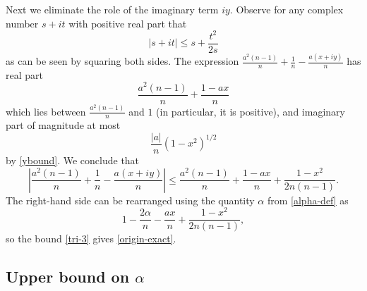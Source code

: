 \documentclass[12pt]{article}
\begin{document}
Next we eliminate the role of the imaginary term $iy$.
 Observe for any complex number $s+it$ with positive real part that
$$ |s+it| \leq s + \frac{t^2}{2s}$$
as can be seen by squaring both sides.  The expression $\frac{a^2 (n-1)}{n} + \frac{1}{n} - \frac{a(x+iy)}{n}$ has real part
$$ \frac{a^2 (n-1)}{n} + \frac{1-ax}{n}$$
which lies between $\frac{a^2 (n-1)}{n}$ and $1$ (in particular, it is positive), and imaginary part of magnitude at most
$$ \frac{|a|}{n} (1 - x^2)^{1/2}$$
by \eqref{ybound}. We conclude that
$$ \left| \frac{a^2 (n-1)}{n} + \frac{1}{n} - \frac{a(x+iy)}{n} \right|  
\leq \frac{a^2 (n-1)}{n} + \frac{1-ax}{n} + \frac{1-x^2}{2n(n-1)}.$$
The right-hand side can be rearranged using the quantity $\alpha$ from \eqref{alpha-def} as
$$ 1 - \frac{2\alpha}{n}  - \frac{ax}{n} + \frac{1-x^2}{2n(n-1)},$$
so the bound \eqref{tri-3} gives \eqref{origin-exact}.

\subsection{Upper bound on $\alpha$}
\end{document}
